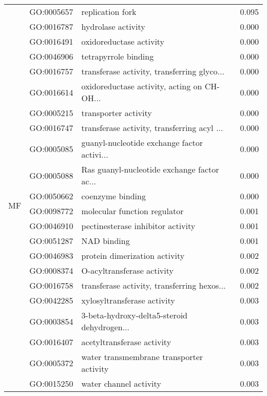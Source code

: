 \begin{longtable}{lllr}
   & GO:0005657 &                             replication fork &         0.095 \\
\cline{1-4}
\multirow{105}{*}{MF} & GO:0016787 &                           hydrolase activity &         0.000 \\
   & GO:0016491 &                      oxidoreductase activity &         0.000 \\
   & GO:0046906 &                         tetrapyrrole binding &         0.000 \\
   & GO:0016757 &  transferase activity, transferring glyco... &         0.000 \\
   & GO:0016614 &  oxidoreductase activity, acting on CH-OH... &         0.000 \\
   & GO:0005215 &                         transporter activity &         0.000 \\
   & GO:0016747 &  transferase activity, transferring acyl ... &         0.000 \\
   & GO:0005085 &  guanyl-nucleotide exchange factor activi... &         0.000 \\
   & GO:0005088 &  Ras guanyl-nucleotide exchange factor ac... &         0.000 \\
   & GO:0050662 &                             coenzyme binding &         0.000 \\
   & GO:0098772 &                 molecular function regulator &         0.001 \\
   & GO:0046910 &            pectinesterase inhibitor activity &         0.001 \\
   & GO:0051287 &                                  NAD binding &         0.001 \\
   & GO:0046983 &                protein dimerization activity &         0.002 \\
   & GO:0008374 &                   O-acyltransferase activity &         0.002 \\
   & GO:0016758 &  transferase activity, transferring hexos... &         0.002 \\
   & GO:0042285 &                  xylosyltransferase activity &         0.003 \\
   & GO:0003854 &  3-beta-hydroxy-delta5-steroid dehydrogen... &         0.003 \\
   & GO:0016407 &                   acetyltransferase activity &         0.003 \\
   & GO:0005372 &     water transmembrane transporter activity &         0.003 \\
   & GO:0015250 &                       water channel activity &         0.003 \\

\end{longtable}

